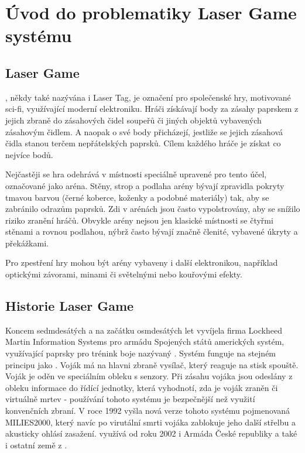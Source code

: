 \chapter{Úvod do problematiky Laser Game systému}

\section{Laser Game}
, někdy také nazývána i Laser Tag, je označení pro společenské hry, motivované sci-fi, využívající moderní elektroniku. Hráči získávají body za zásahy  paprskem z jejich zbraně do zásahových čidel soupeřů či jiných objektů vybavených zásahovým čidlem. A naopak o své body přicházejí, jestliže se jejich zásahová čidla stanou terčem nepřátelských  paprsků. Cílem každého hráče je získat co nejvíce bodů.

Nejčastěji se hra odehrává v místnosti speciálně upravené pro tento účel, označované jako aréna. Stěny, strop a podlaha arény bývají zpravidla pokryty tmavou barvou (černé koberce, koženky a podobné materiály) tak, aby se zabránilo odrazům  paprsků. Zdi v arénách jsou často vypolstrovány, aby se snížilo riziko zranění hráčů. Obvykle arény nejsou jen klasické místnosti se čtyřmi stěnami a rovnou podlahou, nýbrž často bývají značně členité, vybavené úkryty a překážkami.

Pro zpestření hry mohou být arény vybaveny i další elektronikou, například optickými závorami, minami či světelnými nebo kouřovými efekty.

\section{Historie Laser Game}
Koncem sedmdesátých a na začátku osmdesátých let vyvíjela firma Lockheed Martin Information Systems pro armádu Spojených států amerických systém, využívající  paprsky pro trénink boje nazývaný . Systém funguje na stejném principu jako . Voják má na hlavni zbraně  vysílač, který reaguje na stisk spouště. Voják je oděn ve speciálním obleku s  senzory. Při zásahu vojáka jsou odeslány z obleku informace do řídící jednotky, která vyhodnotí, zda je voják zraněn či virtuálně mrtev - používání tohoto systému je bezpečnější než využití konvenčních zbraní. V roce 1992 vyšla nová verze tohoto systému pojmenovaná MILIES2000, který navíc po virutální smrti vojáka zablokuje jeho další střelbu a akusticky ohlásí zasažení.  využívá od roku 2002 i Armáda České republiky a také i ostatní země z .

